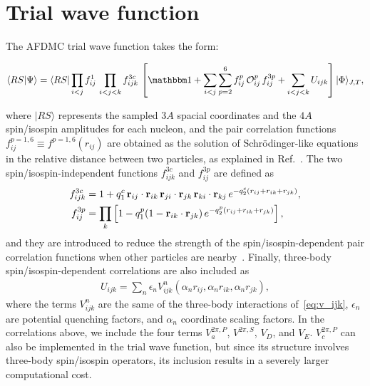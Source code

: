 \documentclass[aps,prc,twocolumn,superscriptaddress,floatfix]{revtex4-1}
\begin{document}
\section{Trial wave function}
\label{sec:wf}
The AFDMC trial wave function takes the form:
\begin{widetext}
\begin{align}
\langle RS|\Psi\rangle=\langle RS|\prod_{i<j}f^1_{ij}\,\prod_{i<j<k}f^{3c}_{ijk}\,
\left[\mathbbm1+\sum_{i<j}\sum_{p=2}^6 f^p_{ij}\,\mathcal O_{ij}^p\, f_{ij}^{3p}
+\sum_{i<j<k}U_{ijk}\right]|\Phi\rangle_{J,T} ,
\label{eq:psi}
\end{align}
\end{widetext}
where $|RS\rangle$ represents the sampled $3A$ spacial coordinates and the $4A$ spin/isospin amplitudes
for each nucleon, and the pair correlation functions $f^{p=1,6}_{ij}\equiv f^{p=1,6}(r_{ij})$ are obtained as the solution
of Schr\"odinger-like equations in the relative distance between two particles, as explained in Ref.~\cite{Carlson:2015}. 
The two spin/isospin-independent functions $f^{3c}_{ijk}$ and $f^{3p}_{ij}$ are defined as
\begin{align}
f^{3c}_{ijk}&=1+q_1^c\,\vb{r}_{ij}\cdot\vb{r}_{ik}\,\vb{r}_{ji}\cdot\vb{r}_{jk}\,
\vb{r}_{ki}\cdot\vb{r}_{kj}\,e^{-q_2^c(r_{ij}+r_{ik}+r_{jk})} ,
\nonumber \\
f_{ij}^{3p}&=\prod_k\left[1-q_1^p(1-\vb{r}_{ik}\cdot\vb{r}_{jk})\,e^{-q_2^p(r_{ij}+r_{ik}+r_{jk})}\right] ,
\end{align}
and they are introduced to reduce the strength of the spin/isospin-dependent pair correlation functions when 
other particles are nearby~\cite{Pudliner:1997}.
Finally, three-body spin/isospin-dependent correlations are also included as 
\begin{align}
U_{ijk}=\sum_n \epsilon_n V_{ijk}^n(\alpha_n r_{ij},\alpha_n r_{ik},\alpha_n r_{jk}) ,
\end{align}
where the terms $V^n_{ijk}$ are the same of the three-body interactions of~\cref{eq:v_ijk}, 
$\epsilon_n$ are potential quenching factors, and $\alpha_n$ coordinate scaling factors.
In the correlations above, we include the four terms $V_a^{2\pi,P}$, $V^{2\pi,S}$,
$V_D$, and $V_E$. $V_c^{2\pi,P}$ can also be implemented in the trial wave function,
but since its structure involves three-body spin/isospin operators, its inclusion 
results in a severely larger computational cost.
\end{document}
